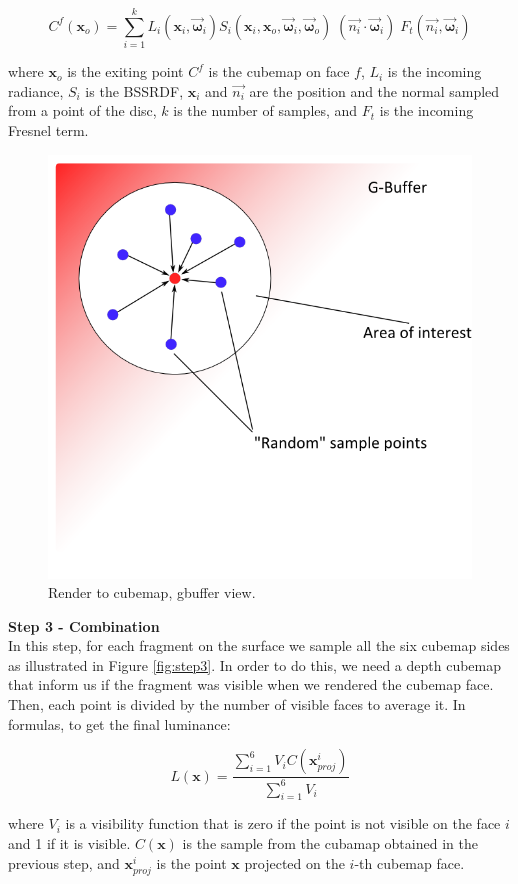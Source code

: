 \[
C^f(\mathbf{x}_o) = \sum_{i = 1}^{k} L_i(\mathbf{x}_i,\vec{\mathbf{\omega}}_i) S_i(\mathbf{x}_i,\mathbf{x}_o,\vec{\mathbf{\omega}}_i, \vec{\mathbf{\omega}}_o) \; (\vec{n_i}\cdot \vec{\mathbf{\omega}}_i) \; F_t(\vec{n_i},\vec{\mathbf{\omega}}_i) 
\]

where $\mathbf{x}_o$ is the exiting point $C^f$ is the cubemap on face $f$, $L_i$ is the incoming radiance, $S_i$ is the BSSRDF, $\mathbf{x}_i$ and $\vec{n_i}$ are the position and the normal sampled from a point of the disc, $k$ is the number of samples, and $F_t$ is the incoming Fresnel term.

\begin{figure}[!ht]
\centering
\includegraphics[width=0.5 \linewidth]{images/method/method_gbuffer}
\caption{Render to cubemap, gbuffer view.}
\label{fig:stepgbuffer}
\end{figure} 

\FloatBarrier
\textbf{Step 3 - Combination} \\
In this step, for each fragment on the surface we sample all the six cubemap sides as illustrated in Figure \ref{fig:step3}. In order to do this, we need a depth cubemap that inform us if the fragment was visible when we rendered the cubemap face. Then, each point is divided by the number of visible faces to average it. In formulas, to get the final luminance:

$$
L(\mathbf{x}) = \frac{\sum_{i = 1}^{6}V_{i}C(\mathbf{x}_{proj}^i)}{\sum_{i = 1}^{6}V_{i}}
$$

where $V_{i}$ is a visibility function that is zero if the point is not visible on the face $i$ and 1 if it is visible. $C(\mathbf{x})$ is the sample from the cubamap obtained in the previous step, and $\mathbf{x}_{proj}^i$ is the point $\mathbf{x}$ projected on the $i$-th cubemap face.

